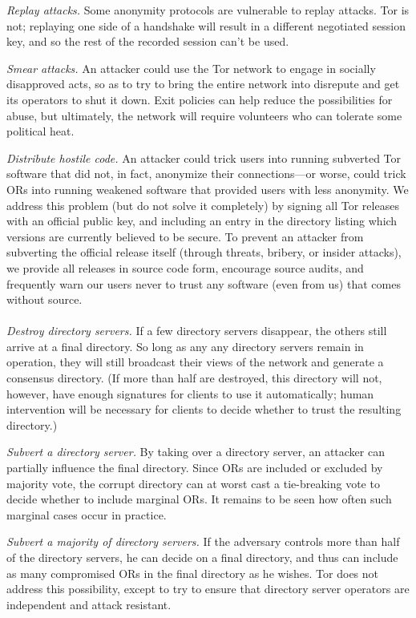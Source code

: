 \documentclass[times,10pt,twocolumn]{article}
\begin{document}
\emph{Replay attacks.} Some anonymity protocols are vulnerable
to replay attacks.  Tor is not; replaying one side of a handshake
will result in a different negotiated session key, and so the rest
of the recorded session can't be used.  

\emph{Smear attacks.} An attacker could use the Tor network to
engage in socially disapproved acts, so as to try to bring the
entire network into disrepute and get its operators to shut it down.
Exit policies can help reduce the possibilities for abuse, but
ultimately, the network will require volunteers who can tolerate
some political heat.

\emph{Distribute hostile code.} An attacker could trick users
into running subverted Tor software that did not, in fact, anonymize
their connections---or worse, could trick ORs into running weakened
software that provided users with less anonymity.  We address this
problem (but do not solve it completely) by signing all Tor releases
with an official public key, and including an entry in the directory
listing which versions are currently believed to be secure.  To
prevent an attacker from subverting the official release itself
(through threats, bribery, or insider attacks), we provide all
releases in source code form, encourage source audits, and
frequently warn our users never to trust any software (even from
us) that comes without source.\\

\\
\emph{Destroy directory servers.}  If a few directory
servers disappear, the others still arrive at a final
directory.  So long as any any directory servers remain in operation,
they will still broadcast their views of the network and generate a
consensus directory.  (If more than half are destroyed, this
directory will not, however, have enough signatures for clients to
use it automatically; human intervention will be necessary for
clients to decide whether to trust the resulting directory.)

\emph{Subvert a directory server.}  By taking over a directory server,
an attacker can partially influence the final directory.  Since ORs
are included or excluded by majority vote, the corrupt directory can
at worst cast a tie-breaking vote to decide whether to include
marginal ORs.  It remains to be seen how often such marginal cases
occur in practice.

\emph{Subvert a majority of directory servers.}  If the
adversary controls more than half of the directory servers, he can
decide on a final directory, and thus can include as many
compromised ORs in the final directory as he wishes. 
Tor does not address this possibility, except to try to ensure that
directory server operators are independent and attack resistant.
\end{document}
